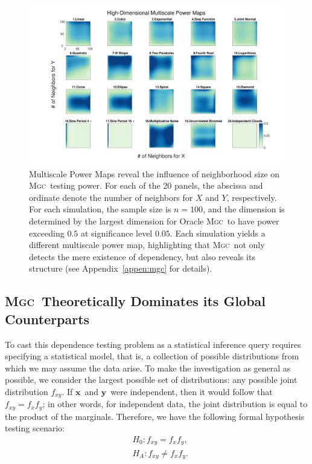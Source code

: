 \documentclass[11pt]{article}
\providecommand{\sct}[1]{{\normalfont\textsc{#1}}}
\providecommand{\mb}[1]{\boldsymbol{#1}}
\newcommand{\Mgc}{\sct{Mgc}}
\newcommand{\mbx}{\ensuremath{\mb{x}}}
\newcommand{\mby}{\ensuremath{\mb{y}}}
\begin{document}
\begin{figure}[htbp]
\includegraphics[width=1.0\textwidth]{Figures/FigHDHeat}
\caption{Multiscale Power Maps reveal the influence of neighborhood size on \Mgc~testing power.
For each of the 20 panels, the abscissa and ordinate denote the number of neighbors for $X$ and  $Y$, respectively. For each simulation, the sample size is $n=100$,  and the dimension is determined by the largest dimension for Oracle \Mgc~to have power exceeding $0.5$ at significance level  $0.05$. Each simulation yields a different multiscale power map, highlighting that \Mgc~not only detects the mere existence of dependency, but also reveals its  structure  (see Appendix~\ref{appen:mgc} for details).}
\label{f:powermaps}
\end{figure}


\subsection*{\Mgc~Theoretically Dominates its Global Counterparts}
\label{s:theory}

To cast this dependence testing problem as a statistical inference query requires specifying a statistical model, that is, a collection of possible distributions from which we may assume the data arise.  To make the investigation as general as possible, we consider the largest possible set of distributions: any possible joint distribution $f_{xy}$. If \mbx~and \mby~were independent, then it would follow that $f_{xy}=f_x f_y$; in other words, for independent data, the joint distribution is equal to the product of the marginals.  Therefore, we have the following formal hypothesis testing scenario:
\begin{align*}
& H_{0}: f_{xy}=f_{x}f_{y},\\
& H_{A}: f_{xy} \neq f_{x}f_{y}.
\end{align*}
\end{document}
